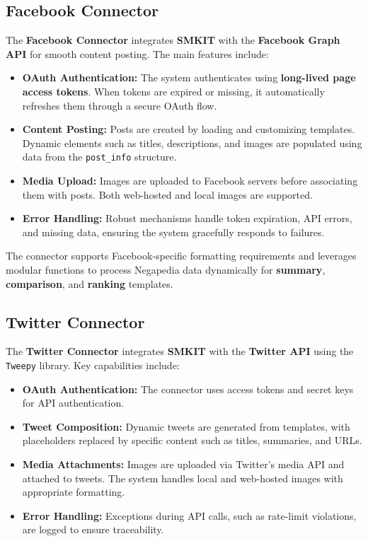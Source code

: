 \subsection{Facebook Connector}
\label{subsec:facebook_connector}
The \textbf{Facebook Connector} integrates \textbf{SMKIT} with the \textbf{Facebook Graph API} for smooth content posting. The main features include:

\begin{itemize}
    \item \textbf{OAuth Authentication:} The system authenticates using \textbf{long-lived page access tokens}. When tokens are expired or missing, it automatically refreshes them through a secure OAuth flow.
    \item \textbf{Content Posting:} Posts are created by loading and customizing templates. Dynamic elements such as titles, descriptions, and images are populated using data from the \texttt{post\_info} structure.
    \item \textbf{Media Upload:} Images are uploaded to Facebook servers before associating them with posts. Both web-hosted and local images are supported.
    \item \textbf{Error Handling:} Robust mechanisms handle token expiration, API errors, and missing data, ensuring the system gracefully responds to failures.
\end{itemize}

The connector supports Facebook-specific formatting requirements and leverages modular functions to process Negapedia data dynamically for \textbf{summary}, \textbf{comparison}, and \textbf{ranking} templates.

\subsection{Twitter Connector}
\label{subsec:twitter_connector}
The \textbf{Twitter Connector} integrates \textbf{SMKIT} with the \textbf{Twitter API} using the \texttt{Tweepy} library. Key capabilities include:

\begin{itemize}
    \item \textbf{OAuth Authentication:} The connector uses access tokens and secret keys for API authentication.
    \item \textbf{Tweet Composition:} Dynamic tweets are generated from templates, with placeholders replaced by specific content such as titles, summaries, and URLs.
    \item \textbf{Media Attachments:} Images are uploaded via Twitter's media API and attached to tweets. The system handles local and web-hosted images with appropriate formatting.
    \item \textbf{Error Handling:} Exceptions during API calls, such as rate-limit violations, are logged to ensure traceability.
\end{itemize}

